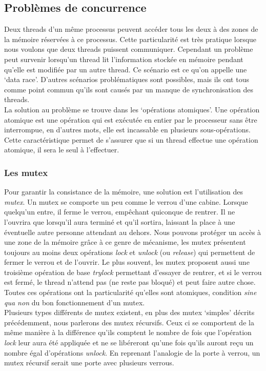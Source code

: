 \documentclass[a4paper,twoside,10pt,english,french,twocolumn]{article}
\theoremstyle{definition}
\theoremstyle{remark}
\theoremstyle{plain}
\begin{document}
\subsection{Problèmes de concurrence}
Deux threads d'un même processus peuvent accéder tous les deux à des zones de la mémoire réservées à ce processus. Cette particularité est très pratique lorsque nous voulons que deux threads puissent communiquer. Cependant un problème peut survenir lorsqu'un thread lit l'information stockée en mémoire pendant qu'elle est modifiée par un autre thread. Ce scénario est ce qu'on appelle une \enquote*{data race}. D'autres scénarios problématiques sont possibles, mais ils ont tous comme point commun qu'ils sont causés par un manque de synchronisation des threads.\\
La solution au problème se trouve dans les \enquote*{opérations atomiques}. Une opération atomique est une opération qui est exécutée en entier par le processeur sans être interrompue, en d'autres mots, elle est incassable en plusieurs sous-opérations. Cette caractéristique permet de s'assurer que si un thread effectue une opération atomique, il sera le seul à l'effectuer.
\subsubsection*{Les mutex}
Pour garantir la consistance de la mémoire, une solution est l'utilisation des \textit{mutex}. Un mutex se comporte un peu comme le verrou d'une cabine. Lorsque quelqu'un entre, il ferme le verrou, empêchant quiconque de rentrer. Il ne l'ouvrira que lorsqu'il aura terminé et qu'il sortira, laissant la place à une éventuelle autre personne attendant au dehors. Nous pouvons protéger un accès à une zone de la mémoire grâce à ce genre de mécanisme, les mutex présentent toujours au moins deux opérations \textit{lock} et \textit{unlock} (ou \textit{release}) qui permettent de fermer le verrou et de l'ouvrir. Le plus souvent, les mutex proposent aussi une troisième opération de base \textit{trylock} permettant d'essayer de rentrer, et si le verrou est fermé, le thread n'attend pas (ne reste pas bloqué) et peut faire autre chose. Toutes ces opérations ont la particularité qu'elles sont atomiques, condition \textit{sine qua non} du bon fonctionnement d'un mutex.\\
Plusieurs types différents de mutex existent, en plus des mutex \enquote*{simples} décrits précédemment, nous parlerons des mutex récursifs. Ceux ci se comportent de la même manière à la différence qu'ils comptent le nombre de fois que l'opération \textit{lock} leur aura été appliquée et ne se libéreront qu'une fois qu'ils auront reçu un nombre égal d'opérations \textit{unlock}. En reprenant l'analogie de la porte à verrou, un mutex récursif serait une porte avec plusieurs verrous.
\end{document}
